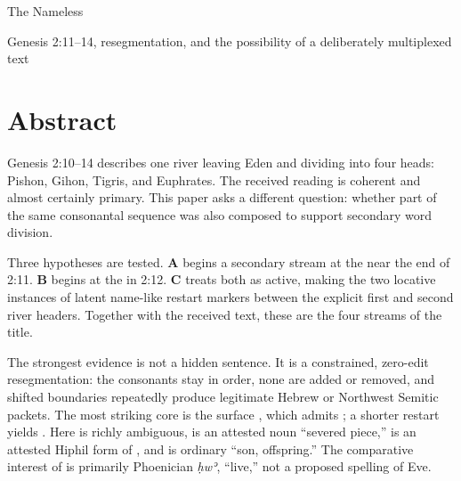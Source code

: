



\pagestyle{plain}
\def\CurrentBook{We Academy}%
\def\CurrentTitleBook{We Academy}%
\def\CurrentApocryphaHeader{We Academy}%
\def\CurrentChapter{The Four Streams}%
%



\begin{center}
{\large The Nameless\par}
\vspace{0.35em}
{\small Genesis 2:11--14, resegmentation, and the possibility of a deliberately multiplexed text\par}
\end{center}

\section*{Abstract}

Genesis 2:10--14 describes one river leaving Eden and dividing into four heads: Pishon, Gihon, Tigris, and Euphrates. The received reading is coherent and almost certainly primary. This paper asks a different question: whether part of the same consonantal sequence was also composed to support secondary word division.

Three hypotheses are tested. \textbf{A} begins a secondary stream at the  near the end of 2:11. \textbf{B} begins at the  in 2:12. \textbf{C} treats both as active, making the two locative instances of  latent name-like restart markers between the explicit first and second river headers. Together with the received text, these are the four streams of the title.

The strongest evidence is not a hidden sentence. It is a constrained, zero-edit resegmentation: the consonants stay in order, none are added or removed, and shifted boundaries repeatedly produce legitimate Hebrew or Northwest Semitic packets. The most striking core is the surface , which admits ; a shorter restart yields . Here  is richly ambiguous,  is an attested noun ``severed piece,''  is an attested Hiphil form of , and  is ordinary ``son, offspring.'' The comparative interest of  is primarily Phoenician \textit{ḥwʾ}, ``live,'' not a proposed spelling of Eve.

